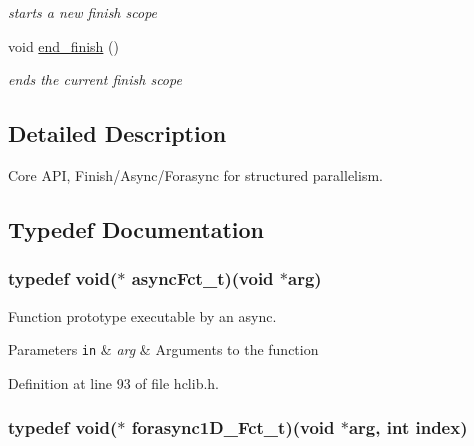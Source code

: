 \begin{DoxyCompactItemize}
\begin{DoxyCompactList}\small\item\em starts a new finish scope \end{DoxyCompactList}\item 
\hypertarget{group__HClib_ga181b944819de60ea47b024531a127bbf}{void \hyperlink{group__HClib_ga181b944819de60ea47b024531a127bbf}{end\-\_\-finish} ()}\label{group__HClib_ga181b944819de60ea47b024531a127bbf}

\begin{DoxyCompactList}\small\item\em ends the current finish scope \end{DoxyCompactList}\end{DoxyCompactItemize}


\subsection{Detailed Description}
Core A\-P\-I, Finish/\-Async/\-Forasync for structured parallelism. 

\subsection{Typedef Documentation}
\hypertarget{group__HClib_ga20743540e3494c2c031dffd26bf92915}{
\subsubsection[{async\-Fct\-\_\-t}]{\setlength{\rightskip}{0pt plus 5cm}typedef void($\ast$ async\-Fct\-\_\-t)(void $\ast$arg)}}\label{group__HClib_ga20743540e3494c2c031dffd26bf92915}


Function prototype executable by an async. 


\begin{DoxyParams}[1]{Parameters}
\mbox{\tt in}  & {\em arg} & Arguments to the function \\
\hline
\end{DoxyParams}


Definition at line 93 of file hclib.\-h.

\hypertarget{group__HClib_gac1d6e6334c34de2b8f463abf8de88e70}{
\subsubsection[{forasync1\-D\-\_\-\-Fct\-\_\-t}]{\setlength{\rightskip}{0pt plus 5cm}typedef void($\ast$ forasync1\-D\-\_\-\-Fct\-\_\-t)(void $\ast$arg, int index)}}\label{group__HClib_gac1d6e6334c34de2b8f463abf8de88e70}


